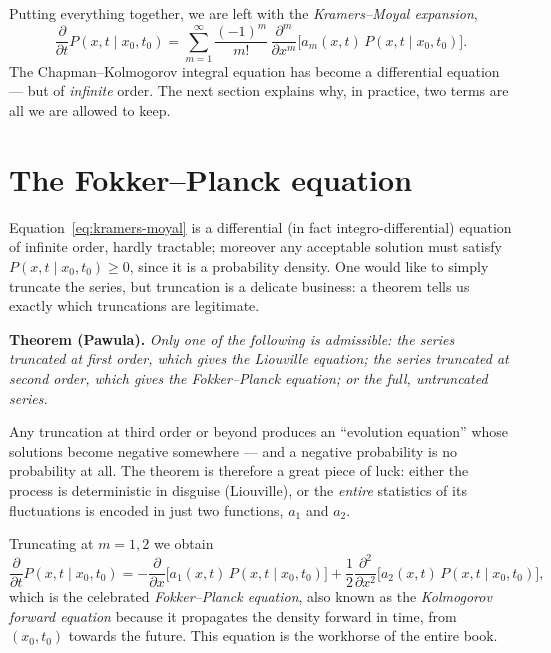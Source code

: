 Putting everything together, we are left with the \emph{Kramers--Moyal expansion},
\begin{equation}
\frac{\partial}{\partial t}P(x,t\mid x_0,t_0) = \sum_{m=1}^{\infty} \frac{(-1)^m}{m!}\,\frac{\partial^m}{\partial x^m}\big[a_m(x,t)\,P(x,t\mid x_0,t_0)\big].
\label{eq:kramers-moyal}
\end{equation}
The Chapman--Kolmogorov integral equation has become a differential equation\cite{Kolmogorov1931} --- but of \emph{infinite} order.
The next section explains why, in practice, two terms are all we are allowed to keep.


\section{The Fokker--Planck equation}

Equation~\eqref{eq:kramers-moyal} is a differential (in fact integro-differential) equation of infinite order, hardly tractable; moreover any acceptable solution must satisfy $P(x,t\mid x_0,t_0)\ge0$, since it is a probability density.
One would like to simply truncate the series, but truncation is a delicate business: a theorem tells us exactly which truncations are legitimate.

\medskip
\noindent\textbf{Theorem (Pawula).}\cite{Pawula1967}
\emph{Only one of the following is admissible: the series truncated at first order, which gives the Liouville equation; the series truncated at second order, which gives the Fokker--Planck equation; or the full, untruncated series.}
\medskip

Any truncation at third order or beyond produces an ``evolution equation'' whose solutions become negative somewhere --- and a negative probability is no probability at all.
The theorem is therefore a great piece of luck: either the process is deterministic in disguise (Liouville), or the \emph{entire} statistics of its fluctuations is encoded in just two functions, $a_1$ and $a_2$.

Truncating at $m=1,2$ we obtain
\begin{equation}
\frac{\partial}{\partial t}P(x,t\mid x_0,t_0) = -\frac{\partial}{\partial x}\big[a_1(x,t)\,P(x,t\mid x_0,t_0)\big] + \frac{1}{2}\frac{\partial^2}{\partial x^2}\big[a_2(x,t)\,P(x,t\mid x_0,t_0)\big],
\label{eq:fokker-planck}
\end{equation}
which is the celebrated \emph{Fokker--Planck equation}, also known as the \emph{Kolmogorov forward equation} because it propagates the density forward in time, from $(x_0,t_0)$ towards the future.\cite{Risken1989,Gardiner2009}
This equation is the workhorse of the entire book.


